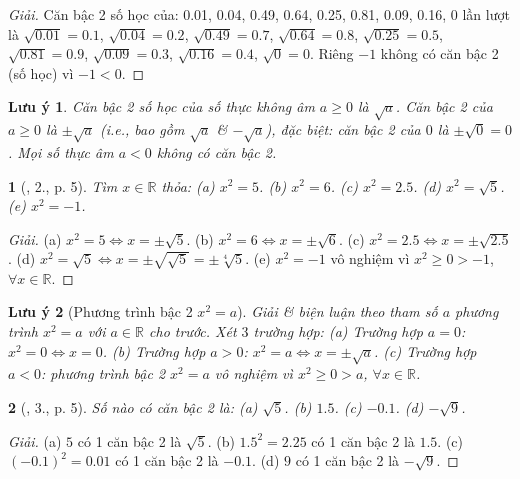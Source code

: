 \documentclass{article}
\newtheorem{baitoan}{}
\newtheorem{luuy}{Lưu ý}
\begin{document}
\begin{proof}[Giải]
	Căn bậc 2 số học của: 0.01, 0.04, 0.49, 0.64, 0.25, 0.81, 0.09, 0.16, 0 lần lượt là $\sqrt{0.01} = 0.1$, $\sqrt{0.04} = 0.2$, $\sqrt{0.49} = 0.7$, $\sqrt{0.64} = 0.8$, $\sqrt{0.25} = 0.5$, $\sqrt{0.81} = 0.9$, $\sqrt{0.09} = 0.3$, $\sqrt{0.16} = 0.4$, $\sqrt{0} = 0$. Riêng $-1$ không có căn bậc 2 (số học) vì $-1 < 0$.
\end{proof}

\begin{luuy}
	Căn bậc 2 số học của số thực không âm $a\ge0$ là $\sqrt{a}$. Căn bậc 2 của $a\ge0$ là $\pm\sqrt{a}$ (i.e., bao gồm $\sqrt{a}$ \& $-\sqrt{a}$), đặc biệt: căn bậc 2 của $0$ là $\pm\sqrt{0} = 0$. Mọi số thực âm $a < 0$ không có căn bậc 2. 
\end{luuy}

\begin{baitoan}[\cite{SBT_Toan_9_tap_1}, 2., p. 5]
	Tìm $x\in\mathbb{R}$ thỏa: (a) $x^2 = 5$. (b) $x^2 = 6$. (c) $x^2 = 2.5$. (d) $x^2 = \sqrt{5}$. (e) $x^2 = -1$.
\end{baitoan}

\begin{proof}[Giải]
	(a) $x^2 = 5\Leftrightarrow x = \pm\sqrt{5}$. (b) $x^2 = 6\Leftrightarrow x = \pm\sqrt{6}$. (c) $x^2 = 2.5\Leftrightarrow x = \pm\sqrt{2.5}$. (d) $x^2 = \sqrt{5}\Leftrightarrow x = \pm\sqrt{\sqrt{5}} = \pm\sqrt[4]{5}$. (e) $x^2 = -1$ vô nghiệm vì $x^2\ge0 > -1$, $\forall x\in\mathbb{R}$.
\end{proof}

\begin{luuy}[Phương trình bậc 2 $x^2 = a$]
	Giải \& biện luận theo tham số $a$ phương trình $x^2 = a$ với $a\in\mathbb{R}$ cho trước. Xét $3$ trường hợp: (a) Trường hợp $a = 0$: $x^2 = 0\Leftrightarrow x = 0$. (b) Trường hợp $a > 0$: $x^2 = a\Leftrightarrow x = \pm\sqrt{a}$. (c) Trường hợp $a < 0$: phương trình bậc 2 $x^2 = a$ vô nghiệm vì $x^2\ge0 > a$, $\forall x\in\mathbb{R}$.
\end{luuy}

\begin{baitoan}[\cite{SBT_Toan_9_tap_1}, 3., p. 5]
	Số nào có căn bậc 2 là: (a) $\sqrt{5}$. (b) $1.5$. (c) $-0.1$. (d) $-\sqrt{9}$.
\end{baitoan}

\begin{proof}[Giải]
	(a) $5$ có 1 căn bậc 2 là $\sqrt{5}$. (b) $1.5^2 = 2.25$ có 1 căn bậc 2 là $1.5$. (c) $(-0.1)^2 = 0.01$ có 1 căn bậc 2 là $-0.1$. (d) $9$ có 1 căn bậc 2 là $-\sqrt{9}$.
\end{proof}
\end{document}
